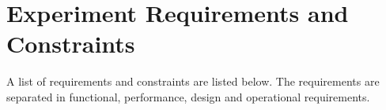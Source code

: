 \pagebreak
\section{Experiment Requirements and Constraints}
A list of requirements and constraints are listed below. The requirements are separated in functional, performance, design and operational requirements. %



\newpage




